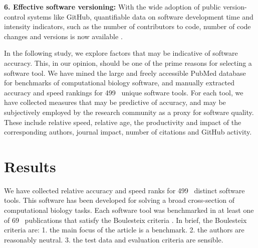 \documentclass{bmcart}
\def\numTools{499}
\def\numBenchmarkPubs{69}
\begin{document}
{\color{red}\textbf{6. Effective software versioning:} With the wide adoption of
public version-control systems like GitHub, quantifiable data on
software development time and intensity indicators, such as the number
of contributors to code, number of code changes and versions is
now available \cite{ray2014large,Dozmorov:2018,Mangul:2019}.}

In the following study, we explore factors that may be indicative of
software accuracy. This, in our opinion, should be one of the prime
reasons for selecting a software tool. We have mined the large and
freely accessible PubMed database \cite{Sayers2010-vm} for benchmarks
of computational biology software, and manually extracted accuracy and
speed rankings for {\color{black}\numTools~} unique software tools. For
each tool, we have collected measures that may be predictive
of accuracy, and may be subjectively employed by the research
community as a proxy for software quality. These include relative
speed, relative age, the productivity and impact of the corresponding
authors, journal impact, number of citations {\color{red}and GitHub activity}.

\section*{Results}
We have collected relative accuracy and speed ranks for
{\color{black}\numTools~} distinct software tools. This software has
been developed for solving a broad cross-section of computational biology
tasks.
Each software tool was benchmarked in at least one of
{\color{black}\numBenchmarkPubs~} publications that satisfy the Boulesteix
criteria \cite{Boulesteix2013-vb}. In brief, the Boulesteix criteria
are: 1. the main focus of the article is a benchmark. 2. the authors
are reasonably neutral. 3. the test data and evaluation criteria are
sensible.
\end{document}
